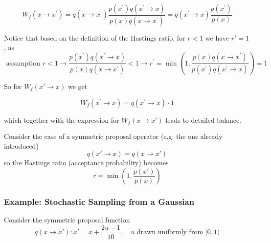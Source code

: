 \begin{equation}
    W_f\left(x \rightarrow x^{\prime}\right)=q\left(x \rightarrow x^{\prime}\right) \frac{p\left(x^{\prime}\right) q\left(x^{\prime} \rightarrow x\right)}{p(x) q\left(x \rightarrow x^{\prime}\right)}=q\left(x^{\prime} \rightarrow x\right) \frac{p\left(x^{\prime}\right)}{p(x)}
\end{equation}

Notice that based on the definition of the Hastings ratio, for $r<1$ we have $r' = 1$, as
\begin{equation}
    \text { assumption } r<1 \rightarrow \frac{p\left(x^{\prime}\right) q\left(x^{\prime} \rightarrow x\right)}{p(x) q\left(x \rightarrow x^{\prime}\right)}<1 \rightarrow r^{\prime}=\min \left(1, \frac{p(x) q\left(x \rightarrow x^{\prime}\right)}{p\left(x^{\prime}\right) q\left(x^{\prime} \rightarrow x\right)}\right)=1
\end{equation}

So for $W_f(x' \rightarrow x)$ we get

\begin{equation}
    W_f\left(x^{\prime} \rightarrow x\right)=q\left(x^{\prime} \rightarrow x\right) \cdot 1
\end{equation}

which together with the expression for $W_f(x \rightarrow x')$ leads to detailed balance.

Consider the case of a symmetric proposal operator (e.g. the one already introduced)
\begin{equation}
    q(x' \rightarrow x) = q(x \rightarrow x')
\end{equation}
so the Hastings ratio (acceptance probability) becomes
\begin{equation}
    r = \min{\left(1, \frac{p(x')}{p(x)}\right)}
\end{equation}

\subsubsection{Example: Stochastic Sampling from a Gaussian}
Consider the symmetric proposal function
\begin{equation}
    q(x \rightarrow x'): x' = x + \frac{2u-1}{10}, \quad u \text{ drawn uniformly from } [0,1)
\end{equation}

